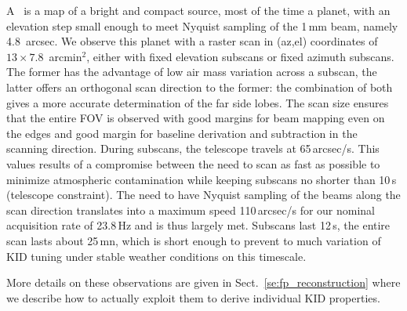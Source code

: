 A \bm\ is a map of a bright and compact source, most of the time a planet, with
an elevation step small enough to meet Nyquist sampling of the 1\,mm beam,
namely 4.8~arcsec. We observe this planet with a raster scan in (az,el)
coordinates of $13\times7.8$~arcmin$^2$, either with fixed elevation subscans or
fixed azimuth subscans. The former has the advantage of low air mass variation
across a subscan, the latter offers an orthogonal scan direction to the former:
the combination of both gives a more accurate determination of the far side
lobes. The scan size ensures that the entire FOV is observed with good margins
for beam mapping even on the edges and good margin for baseline derivation and
subtraction in the scanning direction. During subscans, the telescope travels at
65\,arcsec/s. This values results of a compromise between the need to scan as
fast as possible to minimize atmospheric contamination while keeping subscans no
shorter than 10\,s (telescope constraint). The need to have Nyquist sampling of
the beams along the scan direction translates into a maximum speed 110\,arcsec/s
for our nominal acquisition rate of 23.8\,Hz and is thus largely met. Subscans
last 12\,s, the entire scan lasts about 25\,mn, which is short enough to prevent
to much variation of KID tuning under stable weather conditions on this
timescale.

More details on these observations are given in Sect.~\ref{se:fp_reconstruction}
where we describe how to actually exploit them to derive individual KID
properties.
